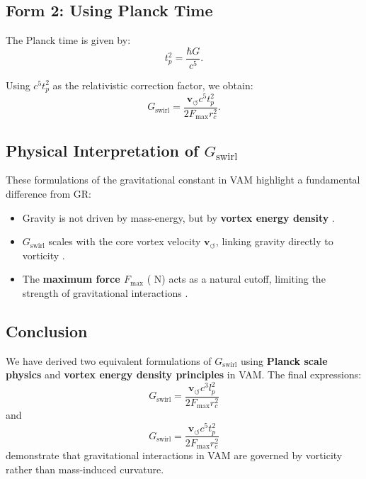     \subsection*{Form 2: Using Planck Time}
    The Planck time is given by:
    \begin{equation*}
        t_p^2 = \frac{\hbar G}{c^5}.
    \end{equation*}

    Using \( c^5 t_p^2 \) as the relativistic correction factor, we obtain:
    \begin{equation*}
        G_\text{swirl} = \frac{\mathbf{v}_{\scriptscriptstyle\boldsymbol{\circlearrowleft}} c^5 t_p^2}{2 F_{\max} r_c^2}.
    \end{equation*}

    \subsection*{Physical Interpretation of \(  G_\text{swirl} \)}
    These formulations of the gravitational constant in VAM highlight a fundamental difference from GR:
    \begin{itemize}
        \item Gravity is not driven by mass-energy, but by \textbf{vortex energy density} \cite{barcelo_superfluid}.
        \item \(  G_\text{swirl} \) scales with the core vortex velocity \( \mathbf{v}_{\scriptscriptstyle\boldsymbol{\circlearrowleft}} \), linking gravity directly to vorticity \cite{moffatt_helicity}.
        \item The \textbf{maximum force \( F_{\max} \)} ( N) acts as a natural cutoff, limiting the strength of gravitational interactions \cite{schiller_max_force}.
    \end{itemize}

    \subsection*{Conclusion}
    We have derived two equivalent formulations of \(  G_\text{swirl} \) using \textbf{Planck scale physics} and \textbf{vortex energy density principles} in VAM. The final expressions:
    \begin{equation*}
        G_\text{swirl} = \frac{\mathbf{v}_{\scriptscriptstyle\boldsymbol{\circlearrowleft}} c^3 l_p^2}{2 F_{\max} r_c^2}
    \end{equation*}
    and
    \begin{equation*}
        G_\text{swirl} = \frac{\mathbf{v}_{\scriptscriptstyle\boldsymbol{\circlearrowleft}} c^5 t_p^2}{2 F_{\max} r_c^2}
    \end{equation*}
    demonstrate that gravitational interactions in VAM are governed by vorticity rather than mass-induced curvature.



